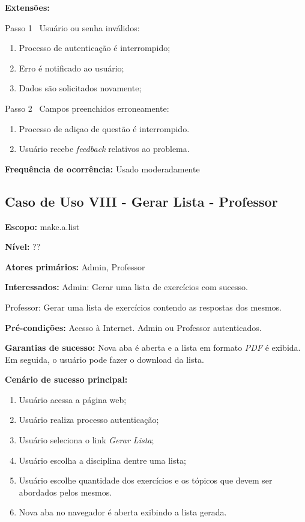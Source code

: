 \documentclass[12pt,oneside,a4paper,article]{abntex2}
\begin{document}
		\textbf{Extensões:} 
		
		Passo 1 \textrightarrow \ Usuário ou senha inválidos:
		
		\begin{enumerate}[label=\alph*.]	
			\item Processo de autenticação é interrompido;
			\item Erro é notificado ao usuário;
			\item Dados são solicitados novamente;
		\end{enumerate}
		
		Passo 2 \textrightarrow \ Campos preenchidos erroneamente:
		
		\begin{enumerate}[label=\alph*.]	
			\item Processo de adiçao de questão é interrompido.
			\item Usuário recebe \textit{feedback} relativos ao problema.	
		\end{enumerate}
		
		\textbf{Frequência de ocorrência:} Usado moderadamente
	
		\subsection{Caso de Uso VIII - Gerar Lista - Professor}
		
			\textbf{Escopo:} make.a.list 
			
			\textbf{Nível:} ??
			
			\textbf{Atores primários:} Admin, Professor
			
			\textbf{Interessados:} Admin: Gerar uma lista de exercícios com sucesso.
			
			Professor: Gerar uma lista de exercícios contendo as respostas dos mesmos.
			
			\textbf{Pré-condições:} Acesso à Internet. Admin ou Professor autenticados.
			
			\textbf{Garantias de sucesso:} Nova aba é aberta e a lista em formato \textit{PDF} é exibida. Em seguida, o usuário pode fazer o download da lista.
			
			\textbf{Cenário de sucesso principal:} 
			
			\begin{enumerate}
				\item Usuário acessa a página web;
				
				\item Usuário realiza processo autenticação;
				
				\item Usuário seleciona o link \textit{Gerar Lista};
				
				\item Usuário escolha a disciplina dentre uma lista;
				
				\item Usuário escolhe quantidade dos exercícios e os tópicos que devem ser abordados pelos mesmos.	
				
				\item Nova aba no navegador é aberta exibindo a lista gerada.
				
			\end{enumerate}
			
\end{document}
